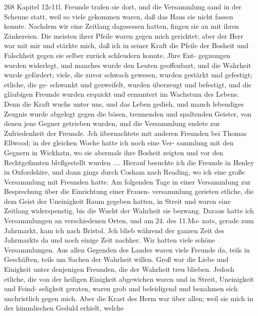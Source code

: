 268 Kapitel 12c11l.
Freunde trafen sie dort, und die Versammlung sand in der
Scheune statt, weil so viele gekommen waren, daß das Haus sie
nicht fassen konnte. Nachdem wir eine Zeitlang dagesessen hatten,
fingen sie an mit ihren Zänkereien. Die meisten ihrer Pfeile
waren gegen mich gerichtet; aber der Herr war mit mir und
stärkte mich, daß ich in seiner Kraft die Pfeile der Bosheit und
Falschheit gegen sie selber zurück schleudern konnte. Jhre Ent-
gegnungen wurden widerlegt, und manches wurde den Leuten
geoffenbart, und die Wahrheit wurde gefördert; viele, die zuvor
schwach gewesen, wurden gestärkt und gefestigt; etliche, die ge-
schwankt und gezweifelt, wurden überzeugt und befestigt, und die
gläubigen Freunde wurden erquickt und ermuntert im Wachstum
des Lebens. Denn die Kraft wuchs unter uns, und das Leben
gedieh, und manch lebendiges Zeugnis wurde abgelegt gegen die
bösen, trennenden und spaltenden Geister, von denen jene Gegner
getrieben wurden, und die Versammlung endete zur Zufriedenheit
der Freunde. Jch iibernachtete mit anderen Freunden bei
Thomas Ellwood; in der gleichen Woche hatte ich noch eine Ver-
sammlung mit den Gegnern in Wickhatn, wo sie abermals ihre
Bosheit zeigten und vor den Rechtgefinnten blvßgestellt wurden ....
Hierauf besuchte ich die Freunde in Henley in Oxfordshire,
und dann gings durch Cosham nach Reading, wo ich eine große
Versammlung mit Freunden hatte. Am folgenden Tage in einer
Versammlung zur Besprechung über die Einrichtung einer Frauen-
versammlung gerieten etliche, die dem Geist der Uneinigkeit Raum
gegeben hatten, in Streit und waren eine Zeitlang widerspenstig,
bis die Wucht der Wahrheit sie bezwang. Daraus hatte ich
Versammlungen an verschiedenen Orten, und am 24. des 11.Mo-
nats, gerade zum Jahrmarkt, kam ich nach Bristol.
Jch blieb während der ganzen Zeit des Jahrmarkts da und
noch einige Zeit nachher. Wir hatten viele schöne Versammlungen.
Aus allen Gegenden des Landes waren viele Freunde da, teils
in Geschäften, teils um Sachen der Wahrheit willen. Groß war
die Liebe und Einigkeit unter denjenigen Freunden, die der
Wahrheit treu blieben. Jedoch etliche, die von der heiligen
Einigkeit abgewichen waren und in Streit, Uneinigkeit und Feind-
seligkeit geraten, waren grob und beleidigend und benahmen sich
unchristlich gegen mich. Aber die Krast des Herm war über
allen; weil sie mich in der himmlischen Geduld erhielt, welche


